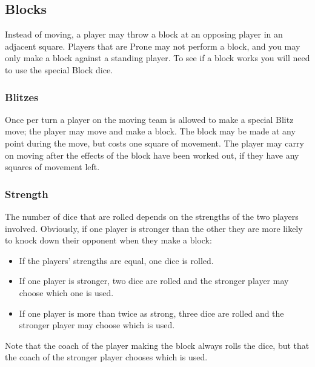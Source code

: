 \documentclass{article}
\begin{document}
\begin{multicols}{2}
\subsection{Blocks}
\par Instead of moving, a player may throw a block at an opposing player in an adjacent square.  Players that are Prone may not perform a block,  and you may only make a block against a standing player. To see if a block works you will need to use the special Block dice.

\subsubsection{Blitzes}
\par Once per turn a player on the moving team is allowed to make a special Blitz move; the player may move and make a block. The block may be made at any point during the move, but costs one square of movement. The player may carry on moving after the effects of the block have been worked out, if they have any squares of movement left.

\subsubsection{Strength}
\par The number of dice that are rolled depends on the strengths of the two players involved. Obviously, if one player is stronger than the other they are more likely to knock down their opponent when they make a block:

\begin{itemize}
\item If the players' strengths are equal, one dice is rolled.
\item If one player is stronger, two dice are rolled and the stronger player may choose which one is used.
\item If one player is more than twice as strong, three dice are rolled and the stronger player may choose which is used.
\end{itemize}

\par Note that the coach of the player making the block always rolls the dice, but that the coach of the stronger player chooses which is used.


\end{multicols}
\end{document}

